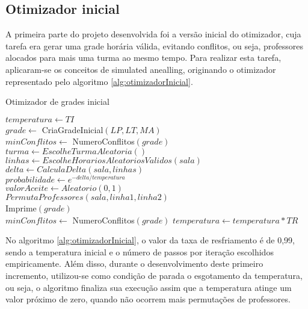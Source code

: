 \subsection{Otimizador inicial}

A primeira parte do projeto desenvolvida foi a versão inicial do otimizador, cuja tarefa era gerar uma grade horária válida, evitando conflitos, ou seja, professores alocados para mais uma turma ao mesmo tempo. Para realizar esta tarefa, aplicaram-se os conceitos de simulated anealling, originando o otimizador representado pelo algoritmo \ref{alg:otimizadorInicial}.

\begin{algorithm}
	\caption{Otimizador de grades inicial}
	\label{alg:otimizadorInicial}
	$temperatura \leftarrow TI$\\
	$grade \leftarrow$ CriaGradeInicial$(LP, LT, MA)$\\
	$minConflitos \leftarrow$ NumeroConflitos$(grade)$\\
	 {
		 {
			$turma \leftarrow EscolheTurmaAleatoria()$\\
			$linhas \leftarrow EscolheHorariosAleatoriosValidos(sala)$\\
			$delta \leftarrow CalculaDelta(sala, linhas)$\\
			$probabilidade \leftarrow e^{-delta/temperatura}$\\
			$valorAceite \leftarrow Aleatorio(0, 1)$\\
			 {
				$PermutaProfessores(sala, linha1, linha2)$\\
				 {
					Imprime$(grade)$\\
					$minConflitos \leftarrow$ NumeroConflitos$(grade)$
				}
			}
		}
		$temperatura \leftarrow temperatura * TR$
	}
\end{algorithm}

No algoritmo \ref{alg:otimizadorInicial}, o valor da taxa de resfriamento é de 0,99, sendo a temperatura inicial e o número de passos por iteração escolhidos empiricamente. Além disso, durante o desenvolvimento deste primeiro incremento, utilizou-se como condição de parada o esgotamento da temperatura, ou seja, o algoritmo finaliza sua execução assim que a temperatura atinge um valor próximo de zero, quando não ocorrem mais permutações de professores.

